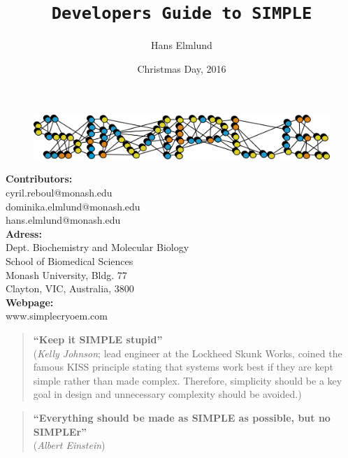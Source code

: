 \documentclass[a4paper,11pt]{article}
\newcommand{\prgname}[1]{\textcolor{NavyBlue}{\texttt{#1}}}
\begin{document}
\begin{figure}
\centering
\includegraphics[keepaspectratio=true,scale=0.6]{./SIMPLE_logo/rawlogo}
\end{figure}

\title{\prgname{Developers Guide to SIMPLE}}
\date{Christmas Day, 2016}
\author{Hans Elmlund}
\maketitle

\vspace{1em}
\begin{minipage}[ht]{0.48\textwidth}
\textbf{Contributors:}\\
cyril.reboul@monash.edu\\
dominika.elmlund@monash.edu\\
hans.elmlund@monash.edu\\
\textbf{Adress:}\\
Dept. Biochemistry and Molecular Biology\\
School of Biomedical Sciences\\
Monash University, Bldg. 77\\
Clayton, VIC, Australia, 3800\\
\textbf{Webpage:}\\
www.simplecryoem.com\\
\end{minipage}
\vspace{20pt}

\begin{quote}
\textbf{``Keep it SIMPLE stupid''}\\(\textit{Kelly Johnson}; lead engineer at the Lockheed Skunk Works, coined the famous KISS principle stating that systems work best if they are kept simple rather than made complex. Therefore, simplicity should be a key goal in design and unnecessary complexity should be avoided.)
\end{quote}

\begin{quote}
\textbf{``Everything should be made as SIMPLE as possible, but no SIMPLEr''}\\(\textit{Albert Einstein})
\end{quote}
\end{document}
